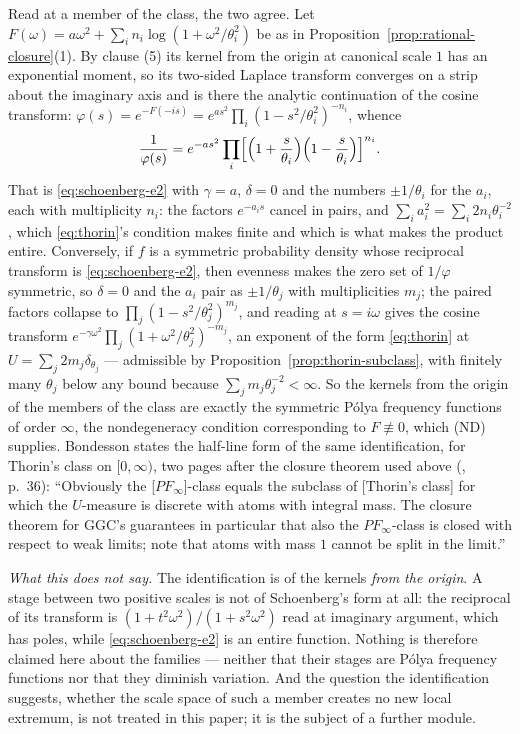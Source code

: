 \begin{remark}
Read at a member of the class, the two agree. Let
$F(\omega) = a\omega^2 + \sum_i n_i\log(1+\omega^2/\theta_i^2)$ be as in
Proposition~\ref{prop:rational-closure}(1). By clause (5) its kernel from the origin at canonical
scale $1$ has an exponential moment, so its two-sided Laplace transform converges on a strip about
the imaginary axis and is there the analytic continuation of the cosine transform:
$\varphi(s) = e^{-F(-is)} = e^{as^2}\prod_i(1-s^2/\theta_i^2)^{-n_i}$, whence
\[
  \frac{1}{\varphi(s)}
   = e^{-as^2}\prod_i\Bigl[\Bigl(1 + \frac{s}{\theta_i}\Bigr)
       \Bigl(1 - \frac{s}{\theta_i}\Bigr)\Bigr]^{n_i} .
\]
That is \ref{eq:schoenberg-e2} with $\gamma = a$, $\delta = 0$ and the numbers $\pm1/\theta_i$
for the $a_i$, each with multiplicity $n_i$: the factors $e^{-a_is}$ cancel in pairs, and
$\sum_i a_i^2 = \sum_i 2n_i\theta_i^{-2}$, which \ref{eq:thorin}'s condition makes finite and
which is what makes the product entire. Conversely, if $f$ is a symmetric probability density
whose reciprocal transform is \ref{eq:schoenberg-e2}, then evenness makes the zero set of
$1/\varphi$ symmetric, so $\delta = 0$ and the $a_i$ pair as $\pm1/\theta_j$ with multiplicities
$m_j$; the paired factors collapse to $\prod_j(1-s^2/\theta_j^2)^{m_j}$, and reading at
$s = i\omega$ gives the cosine transform $e^{-\gamma\omega^2}\prod_j(1+\omega^2/\theta_j^2)^{-m_j}$,
an exponent of the form \ref{eq:thorin} at $U = \sum_j 2m_j\delta_{\theta_j}$ --- admissible by
Proposition~\ref{prop:thorin-subclass}, with finitely many $\theta_j$ below any bound because
$\sum_j m_j\theta_j^{-2} < \infty$. So the kernels from the origin of the members of the class are
exactly the symmetric P\'olya frequency functions of order $\infty$, the nondegeneracy condition
corresponding to $F \not\equiv 0$, which (ND) supplies. Bondesson states the half-line form of the
same identification, for Thorin's class on $[0,\infty)$, two pages after the closure theorem used
above (, p.~36): ``Obviously the [$PF_\infty$]-class equals the
subclass of [Thorin's class] for which the $U$-measure is discrete with atoms with integral mass.
The closure theorem for GGC's guarantees in particular that also the $PF_\infty$-class is closed
with respect to weak limits; note that atoms with mass $1$ cannot be split in the limit.''

\emph{What this does not say.} The identification is of the kernels \emph{from the origin}. A
stage between two positive scales is not of Schoenberg's form at all: the reciprocal of its
transform is $(1+t^2\omega^2)/(1+s^2\omega^2)$ read at imaginary argument, which has poles, while
\ref{eq:schoenberg-e2} is an entire function. Nothing is therefore claimed here about the
families --- neither that their stages are P\'olya frequency functions nor that they diminish
variation. And the question the identification suggests, whether the scale space of such a member
creates no new local extremum, is not treated in this paper; it is the subject of a further
module.
\end{remark}

